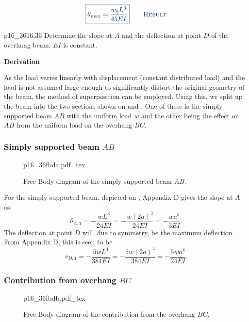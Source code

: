 \documentclass[a4paper]{article}
\newcommand{\incfig}[2][1]{%
  \def\svgwidth{#1\columnwidth}
  {#2.pdf_tex}
}
\newcounter{problem}
\numberwithin{equation}{problem}
\newcommand{\AUheading}[1]{%
  \par\vspace{.4\baselineskip}%
  {\sffamily\bfseries\color{AUblueDark}#1\par}%
  \nobreak%
}
\newenvironment{derivation}[1][Derivation]{%
  \AUheading{#1}
  \begingroup\allowdisplaybreaks
  \setlength{\abovedisplayskip}{6pt}%
  \setlength{\belowdisplayskip}{6pt}%
  \setlength{\abovedisplayshortskip}{4pt}%
  \setlength{\belowdisplayshortskip}{4pt}%
}{\par\endgroup\medskip}
\newcommand{\finalresult}[1]{%
  \vspace{.2\baselineskip}%
  \begin{equation}
    {\color{AUblueDark}\boxed{\displaystyle #1}}
    \tag*{\textsc{\textcolor{AUblueDark}{Result}}}
  \end{equation}
  \newpage
}
\begin{document}
\finalresult{
\theta_{\mathrm{max}} = \frac{w_0 L^3}{45EI}
}

\begin{problemwithimage}{p16_36}{16.36}\label{pro:16-36}
  Determine the slope at $A$ and the deflection at point $D$ of the overhang beam.
  $EI$ is constant.
\end{problemwithimage}

\begin{derivation}
  As the load varies linearly with displacement (constant distributed load) and the load is not assumed large enough to significantly distort the original geometry of the beam, the method of superposition can be employed.
  Using this, we split up the beam into the two sections shown on  and .
  One of these is the simply supported beam $AB$ with the uniform load $w$ and the other being the effect on $AB$ from the uniform load on the overhang $BC$.

  \subsubsection*{Simply supported beam $AB$}
  \begin{figure}[ht]
    \centering
    \incfig{p16_36fbda}
    \caption{Free Body diagram of the simply supported beam $AB$.}
    \label{fig:p16_36fbda}
\end{figure}
  For the simply supported beam, depicted on , Appendix D gives the slope at $A$ as:
  \begin{equation*}
    \theta_{A,1} = - \frac{w L^3}{24 EI} = - \frac{w \left( 2a \right)^3}{24 EI} = - \frac{wa^3}{3EI}
  .\end{equation*}
  The deflection at point $D$ will, due to symmetry, be the maximum deflection.
  From Appendix D, this is seen to be
  \begin{equation*}
    v_{D,1} = - \frac{5 w L^{4}}{384 EI} = - \frac{5 w \left( 2a \right)^{4}}{384 EI} =- \frac{5 w a^{4}}{24EI}
  .\end{equation*}
  
  \subsubsection*{Contribution from overhang $BC$}

  \begin{figure}[ht]
    \centering
    \incfig{p16_36fbdb}
    \caption{Free Body diagram of the contribution from the overhang $BC$.}
    \label{fig:p16_36fbdb}
  \end{figure}


\end{derivation}
\end{document}
